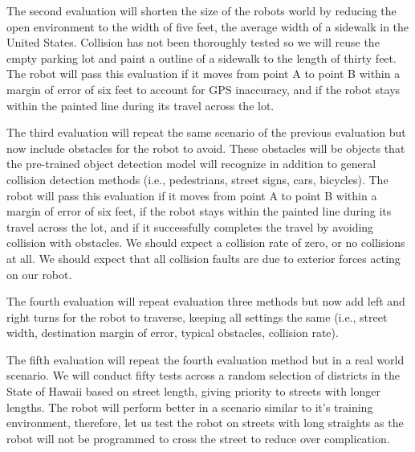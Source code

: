 \documentclass[
  journal=small,
  manuscript=article-type,  %
  year=2022,
  volume=1,
]{cup-journal}
\begin{document}
The second evaluation will shorten the size of the robots world by reducing the open environment to the width of five feet, the average width of a sidewalk in the United States. Collision has not been thoroughly tested so we will reuse the empty parking lot and paint a outline of a sidewalk to the length of thirty feet. The robot will pass this evaluation if it moves from point A to point B within a margin of error of six feet to account for GPS inaccuracy, and if the robot stays within the painted line during its travel across the lot. 

The third evaluation will repeat the same scenario of the previous evaluation but now include obstacles for the robot to avoid. These obstacles will be objects that the pre-trained object detection model will recognize in addition to general collision detection methods (i.e., pedestrians, street signs, cars, bicycles). The robot will pass this evaluation if it moves from point A to point B within a margin of error of six feet, if the robot stays within the painted line during its travel across the lot, and if it successfully completes the travel by avoiding collision with obstacles. We should expect a collision rate of zero, or no collisions at all. We should expect that all collision faults are due to exterior forces acting on our robot. 

The fourth evaluation will repeat evaluation three methods but now add left and right turns for the robot to traverse, keeping all settings the same (i.e., street width, destination margin of error, typical obstacles, collision rate).

The fifth evaluation will repeat the fourth evaluation method but in a real world scenario. We will conduct fifty tests across a random selection of districts in the State of Hawaii based on street length, giving priority to streets with longer lengths.  
The robot will perform better in a scenario similar to it's training environment, therefore, let us test the robot on streets with long straights as the robot will not be programmed to cross the street to reduce over complication. 
\end{document}
